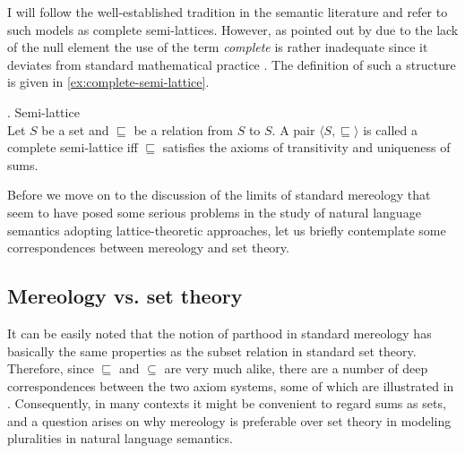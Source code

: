 I will follow the well-established tradition in the semantic literature and refer to such models as complete semi-lattices. However, as pointed out by \citet{champollion2017parts} due to the lack of the null element the use of the term \textit{complete} is rather inadequate since it deviates from standard mathematical practice \citep[see also][]{landman1989groupsi}. The definition of such a structure is given in \ref{ex:complete-semi-lattice}.

\ex. Semi-lattice \citep[p. 17; adapted]{champollion2017parts}\\
Let $S$ be a set and $\sqsubseteq$ be a relation from $S$ to $S$. A pair $\langle S,\sqsubseteq \rangle$ is called a complete semi-lattice iff $\sqsubseteq$ satisfies the axioms of transitivity and uniqueness of sums.\label{ex:complete-semi-lattice}

Before we move on to the discussion of the limits of standard mereology that seem to have posed some serious problems in the study of natural language semantics adopting lattice-theoretic approaches, let us briefly contemplate some correspondences between mereology and set theory.

\subsection{Mereology vs. set theory}\label{sec:mereology-set-theory}

It can be easily noted that the notion of parthood in standard mereology has basically the same properties as the subset relation in standard set theory. Therefore, since $\sqsubseteq$ and $\subseteq$ are very much alike, there are a number of deep correspondences between the two axiom systems, some of which are illustrated in . Consequently, in many contexts it might be convenient to regard sums as sets, and a question arises on why mereology is preferable over set theory in modeling pluralities in natural language semantics.

